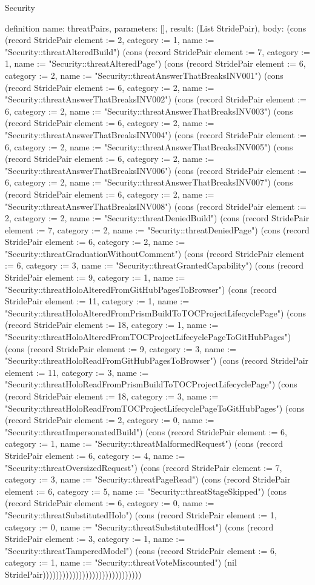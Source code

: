 \begin{lexlean}{Security}
\begin{semanticmodule}
definition{
  name: threatPairs,
  parameters: [],
  result: (List StridePair),
  body: (cons (record StridePair {element := 2, category := 1, name := "Security::threatAlteredBuild"}) (cons (record StridePair {element := 7, category := 1, name := "Security::threatAlteredPage"}) (cons (record StridePair {element := 6, category := 2, name := "Security::threatAnswerThatBreaksINV001"}) (cons (record StridePair {element := 6, category := 2, name := "Security::threatAnswerThatBreaksINV002"}) (cons (record StridePair {element := 6, category := 2, name := "Security::threatAnswerThatBreaksINV003"}) (cons (record StridePair {element := 6, category := 2, name := "Security::threatAnswerThatBreaksINV004"}) (cons (record StridePair {element := 6, category := 2, name := "Security::threatAnswerThatBreaksINV005"}) (cons (record StridePair {element := 6, category := 2, name := "Security::threatAnswerThatBreaksINV006"}) (cons (record StridePair {element := 6, category := 2, name := "Security::threatAnswerThatBreaksINV007"}) (cons (record StridePair {element := 6, category := 2, name := "Security::threatAnswerThatBreaksINV008"}) (cons (record StridePair {element := 2, category := 2, name := "Security::threatDeniedBuild"}) (cons (record StridePair {element := 7, category := 2, name := "Security::threatDeniedPage"}) (cons (record StridePair {element := 6, category := 2, name := "Security::threatGraduationWithoutComment"}) (cons (record StridePair {element := 6, category := 3, name := "Security::threatGrantedCapability"}) (cons (record StridePair {element := 9, category := 1, name := "Security::threatHoloAlteredFromGitHubPagesToBrowser"}) (cons (record StridePair {element := 11, category := 1, name := "Security::threatHoloAlteredFromPrismBuildToTOCProjectLifecyclePage"}) (cons (record StridePair {element := 18, category := 1, name := "Security::threatHoloAlteredFromTOCProjectLifecyclePageToGitHubPages"}) (cons (record StridePair {element := 9, category := 3, name := "Security::threatHoloReadFromGitHubPagesToBrowser"}) (cons (record StridePair {element := 11, category := 3, name := "Security::threatHoloReadFromPrismBuildToTOCProjectLifecyclePage"}) (cons (record StridePair {element := 18, category := 3, name := "Security::threatHoloReadFromTOCProjectLifecyclePageToGitHubPages"}) (cons (record StridePair {element := 2, category := 0, name := "Security::threatImpersonatedBuild"}) (cons (record StridePair {element := 6, category := 1, name := "Security::threatMalformedRequest"}) (cons (record StridePair {element := 6, category := 4, name := "Security::threatOversizedRequest"}) (cons (record StridePair {element := 7, category := 3, name := "Security::threatPageRead"}) (cons (record StridePair {element := 6, category := 5, name := "Security::threatStageSkipped"}) (cons (record StridePair {element := 6, category := 0, name := "Security::threatSubstitutedHolo"}) (cons (record StridePair {element := 1, category := 0, name := "Security::threatSubstitutedHost"}) (cons (record StridePair {element := 3, category := 1, name := "Security::threatTamperedModel"}) (cons (record StridePair {element := 6, category := 1, name := "Security::threatVoteMiscounted"}) (nil StridePair))))))))))))))))))))))))))))))
}


\end{semanticmodule}
\end{lexlean}
